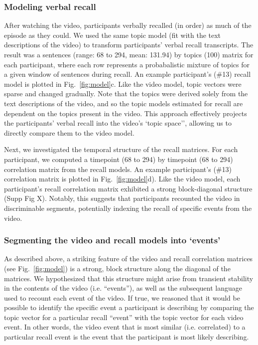 \documentclass{article}
\begin{document}
{\subsubsection{Modeling verbal recall}
After watching the video, participants verbally recalled (in order) as much of the episode as they could.  We used the same topic model (fit with the text descriptions of the video) to transform participants' verbal recall transcripts. The result was a sentences (range: 68 to 294, mean: 131.94) by topics (100) matrix for each participant, where each row represents a probabalistic mixture of topics for a given window of sentences during recall. An example participant's (\#13) recall model is plotted in Fig.~\ref{fig:model}c. Like the video model, topic vectors were sparse and changed gradually.  Note that the topics were derived solely from the text descriptions of the video, and so the topic models estimated for recall are dependent on the topics present in the video. This approach effectively projects the participants' verbal recall into the video's `topic space'', allowing us to directly compare them to the video model.

Next, we investigated the temporal structure of the recall matrices. For each participant, we computed a timepoint (68 to 294) by timepoint (68 to 294) correlation matrix from the recall models. An example participant's (\#13) correlation matrix is plotted in Fig.~\ref{fig:model}d). Like the video model, each participant's recall correlation matrix exhibited a strong block-diagonal structure (Supp Fig X). Notably, this suggests that participants recounted the video in discriminable segments, potentially indexing the recall of specific events from the video.

\subsubsection{Segmenting the video and recall models into `events'}
As described above, a striking feature of the video and recall correlation matrices (see Fig.~\ref{fig:model}) is a strong, block structure along the diagonal of the matrices.  We hypothesized that this structure might arise from transient stability in the contents of the video (i.e. ``events''), as well as the subsequent language used to recount each event of the video. If true, we reasoned that it would be possible to identify the specific event a participant is describing by comparing the topic vector for a particular recall ``event'' with the topic vector for each video event. In other words, the video event that is most similar (i.e. correlated) to a particular recall event is the event that the participant is most likely describing.

}
\end{document}
